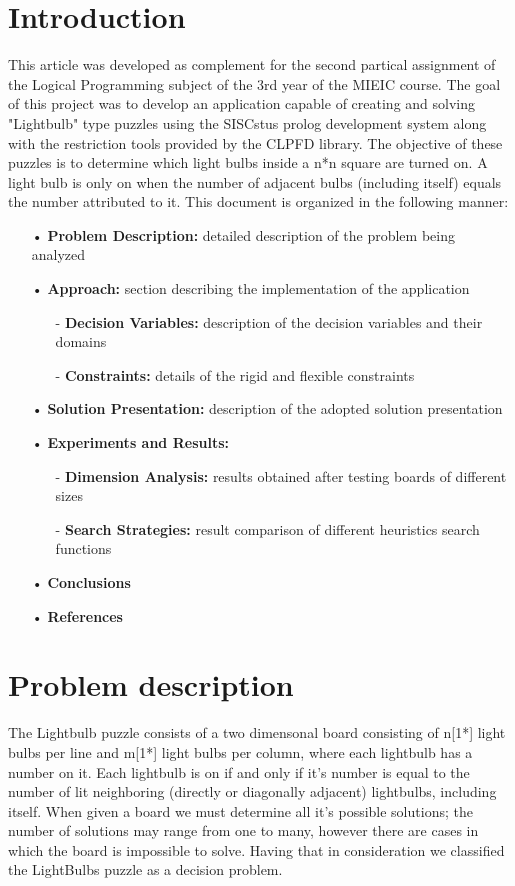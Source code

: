 \documentclass[runningheads]{llncs}
\begin{document}
\section{Introduction}
This article was developed as complement for the second partical assignment of the Logical Programming subject of the 3rd year of the MIEIC course. The goal of this project was to develop an application capable of creating and solving "Lightbulb" type puzzles using the SISCstus prolog development system along with the restriction tools provided by the CLPFD library. The objective of these puzzles is to determine which light bulbs inside a n*n square are turned on. A light bulb is only on when the number of adjacent bulbs (including itself) equals the number attributed to it. This document is organized in the following manner:
	\begin{itemize}
		\item[•] \textbf{Problem Description:} detailed description of the problem being analyzed
		\item[•] \textbf{Approach:} section describing the implementation of the application
		\begin{itemize}
			\item[-] \textbf{Decision Variables:} description of the decision variables and their domains
			\item[-] \textbf{Constraints:} details of the rigid and flexible constraints
		\end{itemize}
		\item[•] \textbf{Solution Presentation:} description of the adopted solution presentation
		\item[•] \textbf{Experiments and Results:}
		\begin{itemize}
			\item[-] \textbf{Dimension Analysis:} results obtained after testing boards of different sizes
			\item[-] \textbf{Search Strategies:} result comparison of different heuristics search functions
		\end{itemize}
		\item[•] \textbf{Conclusions}
		\item[•] \textbf{References}
	\end{itemize}

\section{Problem description}
The Lightbulb puzzle consists of a two dimensonal board consisting of n[1*] light bulbs per line and m[1*] light bulbs per column, where each lightbulb has a number on it.
Each lightbulb is on if and only if it's number is equal to the number of lit neighboring (directly or diagonally adjacent) lightbulbs, including itself. When given a board we must determine all it's possible solutions; the number of solutions may range from one to many, however there are cases in which the board is impossible to solve. Having that in consideration we classified the LightBulbs puzzle as a decision problem.
\end{document}
